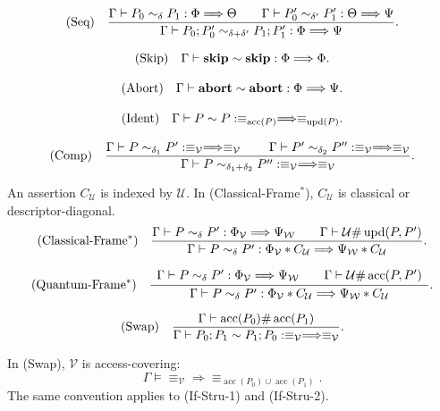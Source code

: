 \documentclass[acmsmall,screen,review,anonymous,nonacm]{acmart}
\theoremstyle{defn_style}
\begin{document}
\[
\text{\rm (Seq)}
\quad
\frac{
\Gamma
\vdash
P_0\sim_{\delta}P_1:
\Phi\Longrightarrow\Theta
\qquad
\Gamma
\vdash
P'_0\sim_{\delta'}P'_1:
\Theta\Longrightarrow\Psi
}{
\Gamma
\vdash
P_0;P'_0
\sim_{\delta+\delta'}
P_1;P'_1
:
\Phi\Longrightarrow\Psi
}.
\]

\[
\text{\rm (Skip)}
\quad
\Gamma
\vdash
\mathbf{skip}\sim\mathbf{skip}:
\Phi\Longrightarrow\Phi .
\]

\[
\text{\rm (Abort)}
\quad
\Gamma
\vdash
\mathbf{abort}\sim\mathbf{abort}:
\Phi\Longrightarrow\Psi .
\]

\[
\text{\rm (Ident)}
\quad
{
\Gamma
\vdash
P\sim P:
\equiv_{\operatorname{acc} (P)}
\Longrightarrow
\equiv_{\operatorname{upd} (P)}
}.
\]

\[
\text{\rm (Comp)}
\quad
\frac{
\Gamma
\vdash
P\sim_{\delta_1}P':
\equiv_{\mathcal V}
\Longrightarrow
\equiv_{\mathcal V}
\qquad
\Gamma
\vdash
P'\sim_{\delta_2}P'':
\equiv_{\mathcal V}
\Longrightarrow
\equiv_{\mathcal V}
}{
\Gamma
\vdash
P\sim_{\delta_1+\delta_2}P'':
\equiv_{\mathcal V}
\Longrightarrow
\equiv_{\mathcal V}
}.
\]

An assertion \(C_{\mathcal U}\) is indexed by \(\mathcal U\). In
(Classical-Frame\({}^{*}\)), \(C_{\mathcal U}\) is classical or
descriptor-diagonal.
\[
\text{\rm (Classical-Frame${}^{*}$)}
\quad
\frac{
\Gamma
\vdash
P\sim_{\delta}P':
\Phi_{\mathcal V}
\Longrightarrow
\Psi_{\mathcal W}\qquad
\Gamma\vdash
\mathcal U
\#
\operatorname{upd}(P,P')}{
\Gamma
\vdash
P\sim_{\delta}P':
\Phi_{\mathcal V} * C_{\mathcal U}
\Longrightarrow
\Psi_{\mathcal W} * C_{\mathcal U}
}.
\]

\[
\text{\rm (Quantum-Frame${}^{*}$)}
\quad
\frac{
\begin{array}{c}
\Gamma
\vdash
P\sim_{\delta}P':
\Phi_{\mathcal V}
\Longrightarrow
\Psi_{\mathcal W}
\qquad
\Gamma\vdash
\mathcal U
\#
\operatorname{acc}(P,P')
\end{array}
}{
\Gamma
\vdash
P\sim_{\delta}P':
\Phi_{\mathcal V} * C_{\mathcal U}
\Longrightarrow
\Psi_{\mathcal W} * C_{\mathcal U}
}.
\]


\[
\text{\rm (Swap)}
\quad
\frac{
\Gamma\vdash
\operatorname{acc}(P_0)\#
\operatorname{acc}(P_1)
}{
\Gamma
\vdash
P_0;P_1
\sim
P_1;P_0
:
\equiv_{\mathcal V}
\Longrightarrow
\equiv_{\mathcal V}
}.
\]

In (Swap), \(\mathcal V\) is access-covering:
\[
\Gamma\vDash
\equiv_{\mathcal V}
\Longrightarrow
\equiv_{\operatorname{acc}(P_0)\cup\operatorname{acc}(P_1)}.
\]
The same convention applies to (If-Stru-1) and (If-Stru-2).
\end{document}

